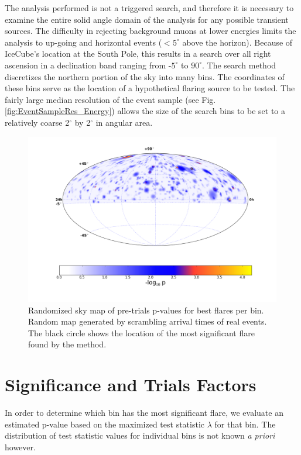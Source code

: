 \documentclass{gatech-thesis}
\begin{document}
The analysis performed is not a triggered search, and therefore it is necessary to examine the entire solid angle domain of the analysis for any possible transient sources. The difficulty in rejecting background muons at lower energies limits the analysis to up-going and horizontal events ($< 5^{\circ}$ above the horizon). Because of IceCube's location at the South Pole, this results in a search over all right ascension in a declination band ranging from -$5^{\circ}$ to $90^{\circ}$. The search method discretizes the northern portion of the sky into many bins. The coordinates of these bins serve as the location of a hypothetical flaring source to be tested. The fairly large median resolution of the event sample (see Fig. \ref{fig:EventSampleRes_Energy}) allows the size of the search bins to be set to a relatively coarse 2$^{\circ}$ by 2$^{\circ}$ in angular area. 


\begin{figure}[ht]
  \begin{center}
    \includegraphics[width=1.0\textwidth,keepaspectratio]{NullMap996.png}
  \end{center}
  \caption{Randomized sky map of pre-trials p-values for best flares per bin. Random map generated by scrambling arrival times of real events. The black circle shows the location of the most significant flare found by the method. }
  \label{fig:NullTrialSkyMap}
\end{figure}

\section{Significance and Trials Factors}
In order to determine which bin has the most significant flare, we evaluate an estimated p-value based on the maximized test statistic $\lambda$ for that bin. The distribution of test statistic values for individual bins is not known \textit{a priori} however.
\end{document}
